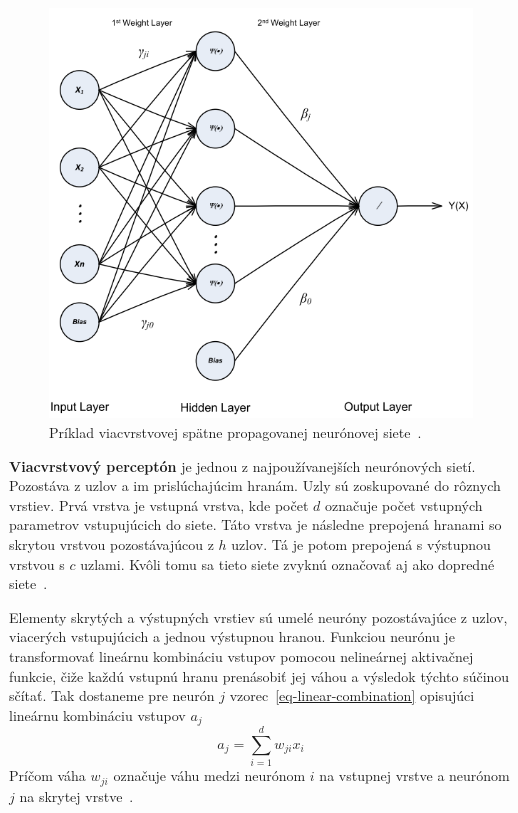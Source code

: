 \documentclass[a4paper,slovak,12pt,appendix]{article}
\begin{document}
\begin{figure}[!ht]
  \centering
  \includegraphics[width=\textwidth]{neural_network.png}
  \caption{Príklad viacvrstvovej spätne propagovanej neurónovej siete~\cite{Kennedy2002}.}
  \label{fig-neural-network}
\end{figure}

\textbf{Viacvrstvový perceptón} je jednou z najpoužívanejších neurónových
sietí. Pozostáva z uzlov a im prislúchajúcim hranám. Uzly sú zoskupované do
rôznych vrstiev. Prvá vrstva je vstupná vrstva, kde počet $d$ označuje počet
vstupných parametrov vstupujúcich do siete. Táto vrstva je následne prepojená
hranami so skrytou vrstvou pozostávajúcou z $h$ uzlov. Tá je potom prepojená
s výstupnou vrstvou s $c$ uzlami. Kvôli tomu sa tieto siete zvyknú označovať aj
ako dopredné siete~\cite{Merz1998}.

Elementy skrytých a výstupných vrstiev sú umelé neuróny pozostávajúce z uzlov,
viacerých vstupujúcich a jednou výstupnou hranou. Funkciou neurónu je
transformovať lineárnu kombináciu vstupov pomocou nelineárnej aktivačnej
funkcie, čiže každú vstupnú hranu prenásobiť jej váhou a výsledok týchto súčinou
sčítať. Tak dostaneme pre neurón $j$ vzorec~\ref{eq-linear-combination}
opisujúci lineárnu kombináciu vstupov $a_j$
\begin{equation}
  a_j = \sum_{i=1}^{d} w_{ji} x_i
  \label{eq-linear-combination}
\end{equation}
Príčom váha $w_{ji}$ označuje váhu medzi neurónom $i$ na vstupnej vrstve
a neurónom $j$ na skrytej vrstve~\cite{Merz1998}.
\end{document}

